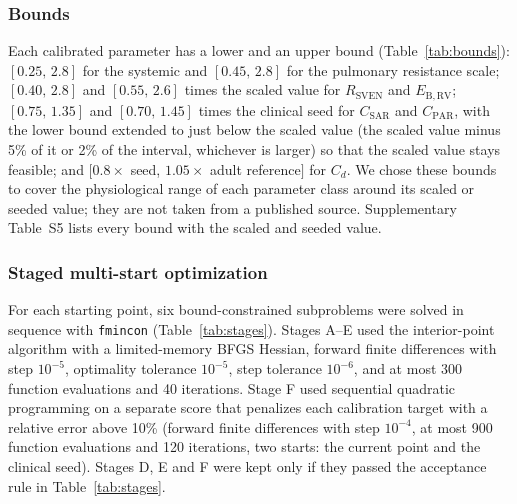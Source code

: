 \subsubsection{Bounds}
Each calibrated parameter has a lower and an upper bound (Table~\ref{tab:bounds}): $[0.25,\,2.8]$ for the systemic and $[0.45,\,2.8]$ for the pulmonary resistance scale; $[0.40,\,2.8]$ and $[0.55,\,2.6]$ times the scaled value for $R_{\mathrm{SVEN}}$ and $E_{\mathrm{B,RV}}$; $[0.75,\,1.35]$ and $[0.70,\,1.45]$ times the clinical seed for $C_{\mathrm{SAR}}$ and $C_{\mathrm{PAR}}$, with the lower bound extended to just below the scaled value (the scaled value minus 5\% of it or 2\% of the interval, whichever is larger) so that the scaled value stays feasible; and $[0.8\times$ seed, $1.05\times$ adult reference$]$ for $C_d$. We chose these bounds to cover the physiological range of each parameter class around its scaled or seeded value; they are not taken from a published source. Supplementary Table~S5 lists every bound with the scaled and seeded value.

\subsubsection{Staged multi-start optimization}
For each starting point, six bound-constrained subproblems were solved in sequence with \texttt{fmincon} (Table~\ref{tab:stages}). Stages A--E used the interior-point algorithm with a limited-memory BFGS Hessian, forward finite differences with step $10^{-5}$, optimality tolerance $10^{-5}$, step tolerance $10^{-6}$, and at most 300 function evaluations and 40 iterations. Stage F used sequential quadratic programming on a separate score that penalizes each calibration target with a relative error above 10\% (forward finite differences with step $10^{-4}$, at most 900 function evaluations and 120 iterations, two starts: the current point and the clinical seed). Stages D, E and F were kept only if they passed the acceptance rule in Table~\ref{tab:stages}.

